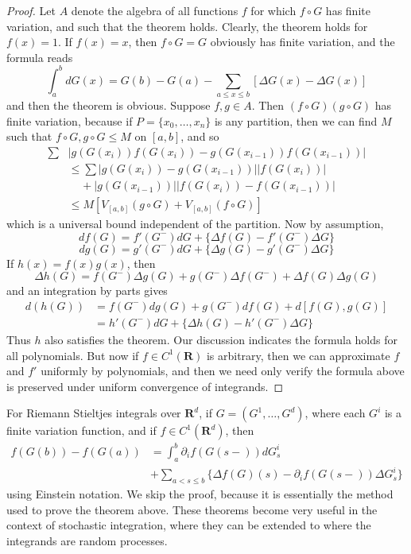 \begin{proof}
    Let $A$ denote the algebra of all functions $f$ for which $f \circ G$ has finite variation, and such that the theorem holds. Clearly, the theorem holds for $f(x) = 1$. If $f(x) = x$, then $f \circ G = G$ obviously has finite variation, and the formula reads
    \[ \int_a^b dG(x) = G(b) - G(a) - \sum_{a \leq x \leq b} [\Delta G(x) - \Delta G(x)] \]
    and then the theorem is obvious. Suppose $f,g \in A$. Then $(f \circ G)(g \circ G)$ has finite variation, because if $P = \{ x_0, \dots, x_n \}$ is any partition, then we can find $M$ such that $f \circ G, g \circ G \leq M$ on $[a,b]$, and so
    \begin{align*}
        \sum & |g(G(x_i))f(G(x_i)) - g(G(x_{i-1}))f(G(x_{i-1}))|\\
        &\leq \sum |g(G(x_i)) - g(G(x_{i-1}))| |f(G(x_i))|\\
        &\ \ \ \ \ + |g(G(x_{i-1}))| |f(G(x_i)) - f(G(x_{i-1}))|\\
        &\leq M[V_{[a,b]}(g \circ G) + V_{[a,b]}(f \circ G)]
    \end{align*}
    which is a universal bound independent of the partition. Now by assumption,
    \[ df(G) = f'(G^-) dG + \{ \Delta f(G) - f'(G^-) \Delta G \} \]
    \[ dg(G) = g'(G^-) dG + \{ \Delta g(G) - g'(G^-) \Delta G \} \]
    If $h(x) = f(x)g(x)$, then
    \[ \Delta h(G) = f(G^-) \Delta g(G) + g(G^-) \Delta f(G^-) + \Delta f(G) \Delta g(G) \]
    and an integration by parts gives
    \begin{align*}
        d(h(G)) &= f(G^-) dg(G) + g(G^-) df(G) + d[f(G),g(G)]\\
        &= h'(G^-) dG + \{ \Delta h(G) - h'(G^-) \Delta G \}
    \end{align*}
    Thus $h$ also satisfies the theorem. Our discussion indicates the formula holds for all polynomials. But now if $f \in C^1(\mathbf{R})$ is arbitrary, then we can approximate $f$ and $f'$ uniformly by polynomials, and then we need only verify the formula above is preserved under uniform convergence of integrands.
\end{proof}

For Riemann Stieltjes integrals over $\mathbf{R}^d$, if $G = (G^1, \dots, G^d)$, where each $G^i$ is a finite variation function, and if $f \in C^1(\mathbf{R}^d)$, then
%
\begin{align*}
    f(G(b)) - f(G(a)) &= \int_a^b \partial_i f(G(s-)) dG^i_s\\
    &+ \sum_{a < s \leq b} \{ \Delta f(G) (s) - \partial_i f(G(s-)) \Delta G^i_s \}
\end{align*}
%
using Einstein notation. We skip the proof, because it is essentially the method used to prove the theorem above. These theorems become very useful in the context of stochastic integration, where they can be extended to where the integrands are random processes.












